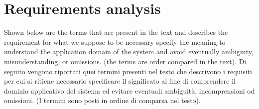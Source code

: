 \documentclass[a4paper]{article}
\begin{document}
\section{Requirements analysis }
Shown below are the terms that are present in the text and describes the requirement for what we suppose to be necessary specify the meaning to understand the application domain of the system and avoid eventually ambiguity, misunderstanding, or omissions. (the terms are order compared in the text).
Di seguito vengono riportati quei termini presenti nel testo che descrivono i requisiti per cui si ritiene necessario specificare il significato al fine di comprendere il dominio applicativo del sistema ed evitare eventuali ambiguità, incomprensioni od omissioni. (I termini sono posti in ordine di comparsa nel testo).
\end{document}
